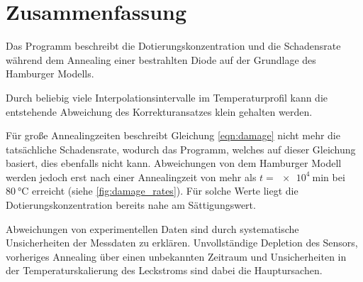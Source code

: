 \chapter{Zusammenfassung}
Das Programm beschreibt die Dotierungskonzentration und die Schadensrate während dem
Annealing einer bestrahlten Diode
auf der Grundlage des Hamburger Modells.

Durch beliebig viele Interpolationsintervalle im Temperaturprofil kann die entstehende Abweichung des
Korrekturansatzes klein gehalten werden.

Für große Annealingzeiten beschreibt Gleichung \ref{eqn:damage} nicht mehr die tatsächliche Schadensrate, wodurch das Programm,
welches auf dieser Gleichung basiert, dies ebenfalls nicht kann. Abweichungen
von dem Hamburger Modell werden jedoch erst nach
einer Annealingzeit von mehr als $t=\SI{e4}{\minute}$ bei $\SI{80}{\celsius}$ erreicht (siehe
\ref{fig:damage_rates}). Für solche Werte liegt
die Dotierungskonzentration bereits nahe am Sättigungswert.



Abweichungen von experimentellen Daten sind durch systematische Unsicherheiten der Messdaten
zu erklären. Unvollständige Depletion des Sensors, vorheriges Annealing über einen
unbekannten Zeitraum und Unsicherheiten in der Temperaturskalierung des Leckstroms sind dabei die Hauptursachen.

